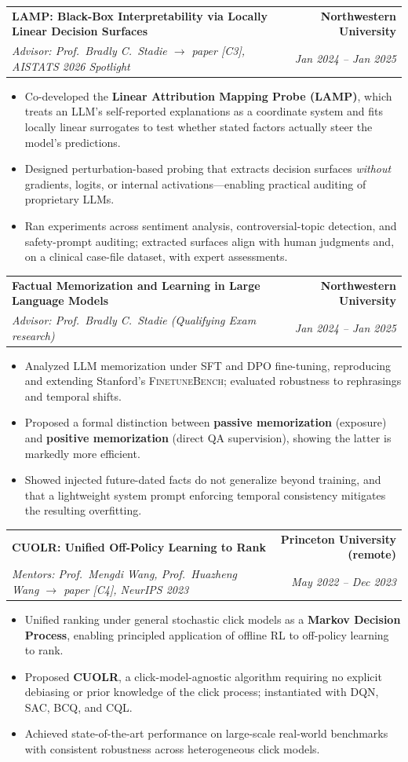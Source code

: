 \documentclass[10.5pt]{article}
\makeatletter
\newcommand{\entry}[4]{%
  \begin{tabularx}{\textwidth}{@{}X@{}r@{}}
    \textbf{#1} & \textbf{#2} \\
    {\itshape\color{metagray}#3} & {\itshape\color{metagray}#4} \\
  \end{tabularx}\vspace{1pt}}
\newenvironment{bullets}
  {\begin{itemize}[leftmargin=1.35em, topsep=2pt, itemsep=1.5pt, parsep=0pt,
                   label=\textcolor{accent}{\footnotesize$\bullet$}]\small}
  {\end{itemize}}
\makeatother
\begin{document}
\vspace{4pt}
\entry{LAMP: Black-Box Interpretability via Locally Linear Decision Surfaces}
  {Northwestern University}
  {Advisor: Prof.\ Bradly C.\ Stadie \quad$\rightarrow$ paper [C3], AISTATS 2026 Spotlight}{Jan 2024 -- Jan 2025}
\begin{bullets}
  \item Co-developed the \textbf{Linear Attribution Mapping Probe (LAMP)}, which treats an LLM's
        self-reported explanations as a coordinate system and fits locally linear surrogates to test
        whether stated factors actually steer the model's predictions.
  \item Designed perturbation-based probing that extracts decision surfaces \emph{without} gradients,
        logits, or internal activations---enabling practical auditing of proprietary LLMs.
  \item Ran experiments across sentiment analysis, controversial-topic detection, and safety-prompt
        auditing; extracted surfaces align with human judgments and, on a clinical case-file dataset,
        with expert assessments.
\end{bullets}

\vspace{4pt}
\entry{Factual Memorization and Learning in Large Language Models}{Northwestern University}
  {Advisor: Prof.\ Bradly C.\ Stadie \quad (Qualifying Exam research)}{Jan 2024 -- Jan 2025}
\begin{bullets}
  \item Analyzed LLM memorization under SFT and DPO fine-tuning, reproducing and extending
        Stanford's \textsc{FinetuneBench}; evaluated robustness to rephrasings and temporal shifts.
  \item Proposed a formal distinction between \textbf{passive memorization} (exposure) and
        \textbf{positive memorization} (direct QA supervision), showing the latter is markedly more efficient.
  \item Showed injected future-dated facts do not generalize beyond training, and that a lightweight
        system prompt enforcing temporal consistency mitigates the resulting overfitting.
\end{bullets}

\vspace{4pt}
\entry{CUOLR: Unified Off-Policy Learning to Rank}{Princeton University (remote)}
  {Mentors: Prof.\ Mengdi Wang, Prof.\ Huazheng Wang \quad$\rightarrow$ paper [C4], NeurIPS 2023}{May 2022 -- Dec 2023}
\begin{bullets}
  \item Unified ranking under general stochastic click models as a \textbf{Markov Decision Process},
        enabling principled application of offline RL to off-policy learning to rank.
  \item Proposed \textbf{CUOLR}, a click-model-agnostic algorithm requiring no explicit debiasing or
        prior knowledge of the click process; instantiated with DQN, SAC, BCQ, and CQL.
  \item Achieved state-of-the-art performance on large-scale real-world benchmarks with consistent
        robustness across heterogeneous click models.
\end{bullets}
\end{document}
